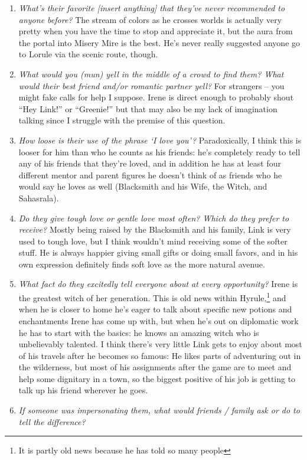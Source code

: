 \begin{enumerate}
    \item\textit{What’s their favorite [insert anything] that they’ve never recommended to anyone before?}
        The stream of colors as he crosses worlds is actually very pretty when you have the time to stop and appreciate it, but the aura from the portal into Misery Mire is the best. He's never really suggested anyone go to Lorule via the scenic route, though. 
    \item\textit{What would you (mun) yell in the middle of a crowd to find them? What would their best friend and/or romantic partner yell?}
        For strangers -- you might fake calls for help I suppose. Irene is direct enough to probably shout ``Hey Link!'' or ``Greenie!'' but that may also be my lack of imagination talking since I struggle with the premise of this question.
    \item\textit{How loose is their use of the phrase ‘I love you’?}
        Paradoxically, I think this is looser for him than who he counts as his friends: he's completely ready to tell any of his friends that they're loved, and in addition he has at least four different mentor and parent figures he doesn't think of as friends who he would say he loves as well (Blacksmith and his Wife, the Witch, and Sahasrala). 
    \item\textit{Do they give tough love or gentle love most often? Which do they prefer to receive?}
        Mostly being raised by the Blacksmith and his family, Link is very used to tough love, but I think wouldn't mind receiving some of the softer stuff. He is always happier giving small gifts or doing small favors, and in his own expression definitely finds soft love as the more natural avenue. 
    \item\textit{What fact do they excitedly tell everyone about at every opportunity?}
        Irene is the greatest witch of her generation. This is old news within Hyrule,\footnote{It is partly old news because he has told so many people} and when he is closer to home he's eager to talk about specific new potions and enchantments Irene has come up with, but when he's out on diplomatic work he has to start with the basics: he knows an amazing witch who is unbelievably talented. I think there's very little Link gets to enjoy about most of his travels after he becomes so famous: He likes parts of adventuring out in the wilderness, but most of his assignments after the game are to meet and help some dignitary in a town, so the biggest positive of his job is getting to talk up his friend wherever he goes.
    \item\textit{If someone was impersonating them, what would friends / family ask or do to tell the difference?}

\end{enumerate}
